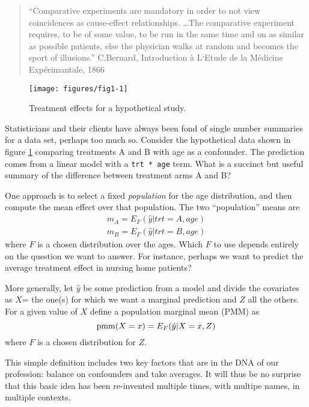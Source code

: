 \documentclass{article}\usepackage[]{graphicx}\usepackage[]{xcolor}
\makeatletter
\def\maxwidth{ %
  \ifdim\Gin@nat@width>\linewidth
    \linewidth
  \else
    \Gin@nat@width
  \fi
}
\newenvironment{knitrout}{}{} %
\newcommand{\code}[1]{\texttt{#1}}
\makeatother
\begin{document}
\begin{quote}
 ``Comparative experiments are mandatory in order to not view
 coincidences as cause-effect relationships. \ldots The comparative
 experiment requires, to be of some value, to be run in the same time
 and on as similar as possible patients, else the physician walks at
 random and becomes the sport of illusions.''  
 C.Bernard, Introduction \`{a} L`Etude de la M\'{e}dicine Exp\'{e}rimantale, 1866
\end{quote}

\begin{figure}
\begin{knitrout}
\color{fgcolor}
\texttt{[image: figures/fig1-1]} 
\end{knitrout}
 \caption{Treatment effects for a hypothetical study.}
 \label{fig1}
\end{figure}

Statisticians and their clients have always been fond of single number
summaries for a data set, perhaps too much so.
Consider the hypothetical data shown in figure \ref{fig1}
comparing treatments A and B with age as a confounder.
The prediction comes from a linear model with a \code{trt * age} term.
What is a succinct but useful summary of the difference between 
treatment arms A and B?

One approach is to select a fixed \emph{population} for the
age distribution, and then compute the
mean effect over that population.
The two ``population'' means are
\begin{align*}
  m_A = E_F(\hat y | trt=A, age) \\
  m_B = E_F(\hat y | trt=B, age)
\end{align*}
where $F$ is a chosen distribution over the ages.
Which $F$ to use depends entirely on the question we want to answer.
For instance, perhaps we want to predict the average treatment effect in
nursing home patients?

More generally, let $\hat y$ be some prediction from a model and divide
the covariates as $X$= the one(s) for which we want a marginal prediction
and $Z$ all the others. For a given value of $X$ define a population
marginal mean (PMM) as
\begin{equation}
  {\rm pmm}(X=x) = E_F(\hat y| X=x, Z) \label{PMM}
\end{equation}
where $F$ is a chosen distribution for $Z$.

This simple definition includes two key factors that are in the
DNA of our profession: balance on confounders and take averages. 
It will thus be no surprise that this basic idea
has been re-invented multiple times, with multipe names, in multiple
contexts.
\end{document}
